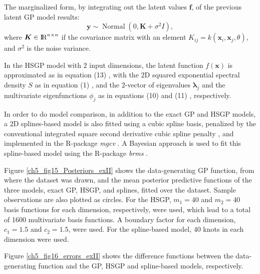 \documentclass[onecolumn,a4paper,11pt]{article}
\DeclareMathOperator{\Normal}{Normal}
\begin{document}
The marginalized form, by integrating out the latent values $\bm{f}$, of the previous latent GP model results:
%
\begin{equation*}\label{ch5_eq_marginalizedgp_simudata2}
\bm{y} \sim \Normal(0, \bm{K} + \sigma^2 I ),
\end{equation*}
%
where $\bm{K} \in {\rm I\!R}^{n\times n}$ if the covariance matrix with an element $K_{ij}=k(\bm{x}_i,\bm{x}_j,\theta)$, and $\sigma^2$ is the noise variance.

In the HSGP model with $2$ input dimensions, the latent function $f(\bm{x})$ is approximated as in equation (13)%
, with the $2$D squared exponential spectral density $S$ as in equation (1)%
, and the $2$-vector of eigenvalues $\bm{\lambda}_j$ and the multivariate eigenfunctions $\phi_j$ as in equations (10) %
 and (11)%
 , respectively.


In order to do model comparison, in addition to the exact GP and HSGP models, a $2$D splines-based model is also fitted using a cubic spline basis, penalized by the conventional integrated square second derivative cubic spline penalty \citep{wood2017generalized}, and implemented in the R-package \textit{mgcv} \citep{wood2011mgcv}. A Bayesian approach is used to fit this spline-based model using the R-package \textit{brms} \citep{burkner2017brms}.

Figure \ref{ch5_fig15_Posteriors_exII} shows the data-generating GP function, from where the dataset was drawn, and the mean posterior predictive functions of the three models, exact GP, HSGP, and splines, fitted over the dataset. Sample observations are also plotted as circles. For the HSGP, $m_1=40$ and $m_2=40$ basis functions for each dimension, respectively, were used, which lead to a total of 1600 multivariate basis functions. A boundary factor for each dimension, $c_1=1.5$ and $c_2=1.5$, were used. For the spline-based model, 40 knots in each dimension were used.

Figure \ref{ch5_fig16_errors_exII} shows the difference functions between the data-generating function and the GP, HSGP and spline-based models, respectively.
\end{document}
